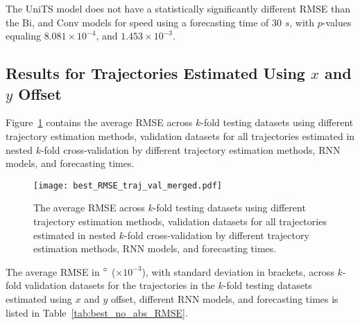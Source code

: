 \documentclass[preprint,12pt]{elsarticle}
\begin{document}
The UniTS model does not have a statistically significantly different RMSE than the Bi, and Conv models for speed using a forecasting time of $30$ $s$, with $p$-values equaling $8.081 \times 10^{-4}$, and $1.453 \times 10^{-3}$.

\subsection{Results for Trajectories Estimated Using $x$ and $y$ Offset}

Figure~\ref{fig:best_RMSE_traj_val_merged} contains the average RMSE across $k$-fold testing datasets using different trajectory estimation methods, validation datasets for all trajectories estimated in nested $k$-fold cross-validation by different trajectory estimation methods, RNN models, and forecasting times.

\begin{figure}[!ht]
	\centering
	\texttt{[image: best\_RMSE\_traj\_val\_merged.pdf]}
	\caption{The average RMSE across $k$-fold testing datasets using different trajectory estimation methods, validation datasets for all trajectories estimated in nested $k$-fold cross-validation by different trajectory estimation methods, RNN models, and forecasting times.}
	\label{fig:best_RMSE_traj_val_merged}
\end{figure}

The average RMSE in $\degree$ ($\times 10^{-3}$), with standard deviation in brackets, across $k$-fold validation datasets for the trajectories in the $k$-fold testing datasets estimated using $x$ and $y$ offset, different RNN models, and forecasting times is listed in Table~\ref{tab:best_no_abs_RMSE}.
\end{document}

